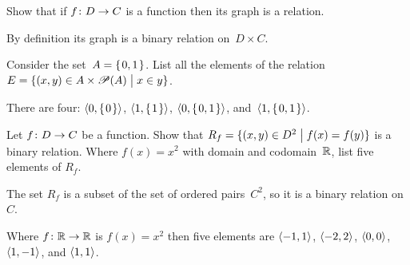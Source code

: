 \documentclass{test}  %
\begin{document}
\begin{problem}
\begin{exes}
\begin{exercise} 
  Show that if $\mbox{$f\colon D\to C$}$ is a function then 
  its graph is a relation.
\end{exercise}
\begin{answer}
  By definition its graph is a binary relation on~$D\times C$.  
\end{answer}
\begin{exercise}
  Consider the set~$A=\mbox{$\{\hspace{0.1em}0,1\hspace{0.1em}\}$}$.
  List all the elements of the relation 
  $E=\{(x,y)\in A\times\mathscr{P}(A) \bigm| x\in y\}$.
\end{exercise}
\begin{answer}
  There are four: $\langle0,\mbox{$\{\hspace{0.1em}0\hspace{0.1em}\}$}\rangle$, 
  $\langle1,\mbox{$\{\hspace{0.1em}1\hspace{0.1em}\}$}\rangle$, $\langle0,\mbox{$\{\hspace{0.1em}0,1\hspace{0.1em}\}$}\rangle$, 
  and~$\langle1,\mbox{$\{\hspace{0.1em}0,1\hspace{0.1em}\}$}\rangle$.   
\end{answer}
\begin{exercise} 
  Let $\mbox{$f\colon D\to C$}$ be a function.
  Show that 
  $R_f=\{(x,y)\in D^2 \bigm| f(x)=f(y)\}$
  is a binary relation.
  Where $f(x)=x^2$ with domain and codomain~$\mathbb{R}$,
  list five elements of $R_f$. 
\end{exercise}
\begin{answer}
  The set $R_f$ is a subset of the set of ordered pairs~$C^2$,
  so it is a binary relation on~$C$.

  Where $\mbox{$f\colon \mathbb{R}\to \mathbb{R}$}$ is $f(x)=x^2$ then five elements are
  $\langle-1,1\rangle$, $\langle-2,2\rangle$, $\langle0,0\rangle$,
  $\langle1,-1\rangle$, and $\langle1,1\rangle$.  
\end{answer}
\end{exes}

\end{problem}
\end{document}
